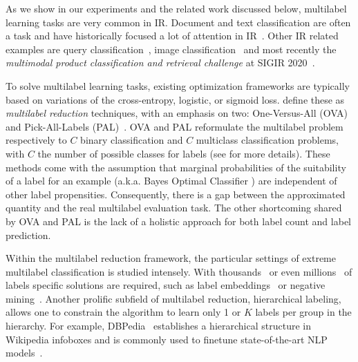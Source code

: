 As we show in our experiments and the related work discussed below, multilabel learning tasks are very common in \ac{IR}. Document and text classification are often a  task and have historically focused a lot of attention in \ac{IR}~\cite{IRClassStat, textCategorization, statTextCategorization, documentClassification}. Other \ac{IR} related examples are query classification~\cite{queryClassification, introIR}, image classification~\cite{imageClassification, faceDetection} and most recently the \textit{multimodal product classification and retrieval challenge} at SIGIR 2020~\cite{Amoualian2020SIGIR2E}. 
\fi

To solve multilabel learning tasks, existing optimization frameworks are typically based on variations of the cross-entropy, logistic, or sigmoid loss. \citeauthor{multilabelReduction} define these as \emph{multilabel reduction} techniques, with an emphasis on two: One-Versus-All (OVA) and Pick-All-Labels (PAL)~\cite{multilabelReduction}. OVA and PAL reformulate the multilabel problem respectively to $C$ binary classification and $C$ multiclass classification problems, with $C$ the number of possible classes for labels (see  for more details). These methods come with the assumption that marginal probabilities of the suitability of a label for an example (a.k.a. Bayes Optimal Classifier ) are independent of other label propensities. Consequently, there is a gap between the approximated quantity and the real multilabel evaluation task. The other shortcoming shared by OVA and PAL is the lack of a holistic approach for both label count and label prediction.

Within the multilabel reduction framework, the particular settings of extreme multilabel classification is studied intensely. With thousands~\cite{extremeClassification} or even millions~\cite{millionsOfLabels, extremeMilliionsSlice} of labels specific solutions are required, such as label embeddings~\cite{extremeMultilabelEmbeddings} or negative mining~\cite{stochasticNegativeMining}. Another prolific subfield of multilabel reduction, hierarchical labeling, allows one to constrain the algorithm to learn only 1 or $K$ labels per group in the hierarchy. For example, DBPedia~\citep{lehmann2015dbpedia} establishes a hierarchical structure in Wikipedia infoboxes and is commonly used to finetune state-of-the-art NLP models~\citep[see, e.g.,][]{XLNet, ULMFit}. 

